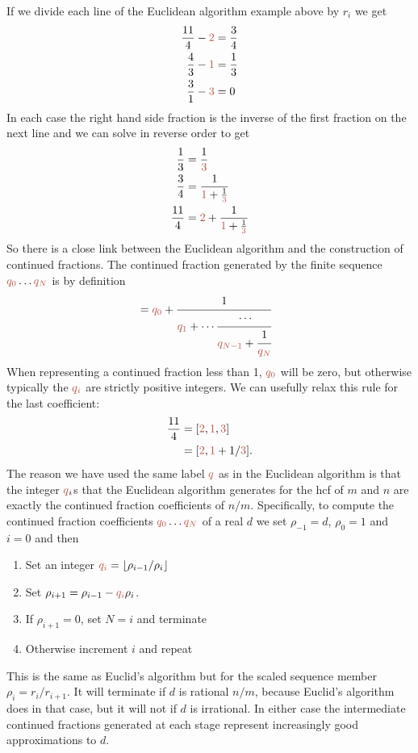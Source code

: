 If we divide each line of the Euclidean algorithm example above by $r_i$ we get
\begin{align}
	\frac{11}{4} - {\jHeadingColour 2} & = \frac{3}{4}
	\\
	\frac{4}{3} - {\jHeadingColour 1} & = \frac{1}{3}
	\\
	\frac{3}{1} - {\jHeadingColour 3} & = 0 
\end{align}
In each case the right hand side fraction is the inverse of the first fraction on the next line and we can solve  in reverse order to get
\begin{align}
	\frac{1}{3} &=  \frac{1}{\jHeadingColour 3}
	\\
	\frac{3}{4} &=  \frac{1}{{\jHeadingColour 1}+ \frac{1}{\jHeadingColour 3}}
	\\
	\frac{11}{4} &=  {\jHeadingColour 2}+
		\frac{1}{{\jHeadingColour 1}+ \frac{1}{\jHeadingColour 3}}
\end{align}
So there is a close link between the Euclidean algorithm and the construction of continued fractions. 
The continued fraction
generated by the finite sequence $\jqix{0}\ldots \jqix{N} $ is by definition
\begin{align}
	[\jqix{0},\ldots  \jqix{N}] &= \jqix{0} +\cfrac{1}{\jqix{1}+\cdots \cfrac{\cdots}{\jqix{{N-1}}+\cfrac{1}{\jqix{N}}}}
\end{align}
When representing a continued fraction less than 1, $\jqix{0}$ will be zero, but otherwise typically the $\jqi$ are strictly positive integers. We can usefully relax this rule for the last coefficient:
\begin{align}
	\frac{11}{4} &=  	[\jqn{2},\jqn{1},\jqn{3}]
	\\
&= 	[\jqn{2},\jqn{1}+1/\jqn{3}].
\end{align}
The reason we have used the same label $\jq$ as in the Euclidean algorithm is that the integer $\jq_i$s that the Euclidean algorithm generates for the hcf of $m$ and $n$ are exactly the continued fraction coefficients of $n/m$. Specifically, to compute the continued fraction coefficients $\jqix{0}\ldots \jqix{N} $ of a real $d$ we set 
$\rho_{-1}=d$, $\rho_{0}=1$ and $i=0$ and then
\begin{enumerate}
	\item Set an integer $\jqi=\lfloor \rho_{i-1}/\rho_{i} \rfloor$
	\item Set $\rho_{i+1} = \rho_{i-1} - \jqi \rho_{i}$. 
	\item If $\rho_{i+1} =0$, set $N=i$ and terminate
	\item Otherwise increment $i$ and repeat
\end{enumerate}
This is  the same as Euclid's algorithm but for the scaled sequence member $\rho_i=r_i/r_{i+1}$. It will terminate if $d$ is rational $n/m$, because Euclid's algorithm does in that case, but it will not if $d$ is irrational. In either case the intermediate continued fractions generated at each stage represent increasingly good approximations to $d$. 

